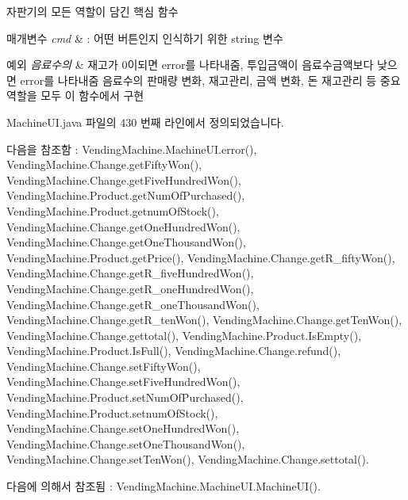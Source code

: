 자판기의 모든 역할이 담긴 핵심 함수 


\begin{DoxyParams}{매개변수}
{\em cmd} & \+: 어떤 버튼인지 인식하기 위한 string 변수 \\
\hline
\end{DoxyParams}

\begin{DoxyExceptions}{예외}
{\em 음료수의} & 재고가 0이되면 error를 나타내줌, 투입금액이 음료수금액보다 낮으면 error를 나타내줌 음료수의 판매량 변화, 재고관리, 금액 변화, 돈 재고관리 등 중요 역할을 모두 이 함수에서 구현 \\
\hline
\end{DoxyExceptions}


Machine\+U\+I.\+java 파일의 430 번째 라인에서 정의되었습니다.



다음을 참조함 \+:  Vending\+Machine.\+Machine\+U\+I.\+error(), Vending\+Machine.\+Change.\+get\+Fifty\+Won(), Vending\+Machine.\+Change.\+get\+Five\+Hundred\+Won(), Vending\+Machine.\+Product.\+get\+Num\+Of\+Purchased(), Vending\+Machine.\+Product.\+getnum\+Of\+Stock(), Vending\+Machine.\+Change.\+get\+One\+Hundred\+Won(), Vending\+Machine.\+Change.\+get\+One\+Thousand\+Won(), Vending\+Machine.\+Product.\+get\+Price(), Vending\+Machine.\+Change.\+get\+R\+\_\+fifty\+Won(), Vending\+Machine.\+Change.\+get\+R\+\_\+five\+Hundred\+Won(), Vending\+Machine.\+Change.\+get\+R\+\_\+one\+Hundred\+Won(), Vending\+Machine.\+Change.\+get\+R\+\_\+one\+Thousand\+Won(), Vending\+Machine.\+Change.\+get\+R\+\_\+ten\+Won(), Vending\+Machine.\+Change.\+get\+Ten\+Won(), Vending\+Machine.\+Change.\+gettotal(), Vending\+Machine.\+Product.\+Is\+Empty(), Vending\+Machine.\+Product.\+Is\+Full(), Vending\+Machine.\+Change.\+refund(), Vending\+Machine.\+Change.\+set\+Fifty\+Won(), Vending\+Machine.\+Change.\+set\+Five\+Hundred\+Won(), Vending\+Machine.\+Product.\+set\+Num\+Of\+Purchased(), Vending\+Machine.\+Product.\+setnum\+Of\+Stock(), Vending\+Machine.\+Change.\+set\+One\+Hundred\+Won(), Vending\+Machine.\+Change.\+set\+One\+Thousand\+Won(), Vending\+Machine.\+Change.\+set\+Ten\+Won(), Vending\+Machine.\+Change.\+settotal().



다음에 의해서 참조됨 \+:  Vending\+Machine.\+Machine\+U\+I.\+Machine\+U\+I().


